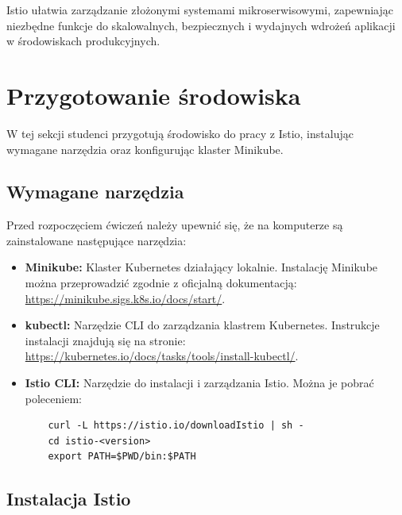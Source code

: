\documentclass{article}
\begin{document}
Istio ułatwia zarządzanie złożonymi systemami mikroserwisowymi, zapewniając niezbędne funkcje do skalowalnych, bezpiecznych i wydajnych wdrożeń aplikacji w środowiskach produkcyjnych.

\section{Przygotowanie środowiska}

W tej sekcji studenci przygotują środowisko do pracy z Istio, instalując wymagane narzędzia oraz konfigurując klaster Minikube.

\subsection{Wymagane narzędzia}

Przed rozpoczęciem ćwiczeń należy upewnić się, że na komputerze są zainstalowane następujące narzędzia:
\begin{itemize}
    \item \textbf{Minikube:} Klaster Kubernetes działający lokalnie. Instalację Minikube można przeprowadzić zgodnie z oficjalną dokumentacją: \url{https://minikube.sigs.k8s.io/docs/start/}.
    \item \textbf{kubectl:} Narzędzie CLI do zarządzania klastrem Kubernetes. Instrukcje instalacji znajdują się na stronie: \url{https://kubernetes.io/docs/tasks/tools/install-kubectl/}.
    \item \textbf{Istio CLI:} Narzędzie do instalacji i zarządzania Istio. Można je pobrać poleceniem:
    \begin{lstlisting}
    curl -L https://istio.io/downloadIstio | sh -
    cd istio-<version>
    export PATH=$PWD/bin:$PATH
    \end{lstlisting}
\end{itemize}

\subsection{Instalacja Istio}
\end{document}
